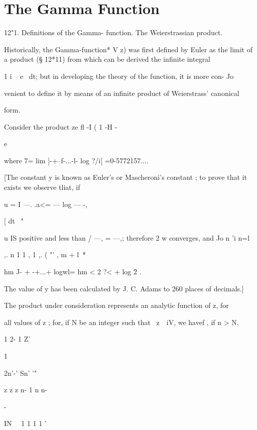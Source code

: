 \chapter{The Gamma Function} 

12"1. Definitions of the Gamma- function. The Weierstrassian product.

Historically, the Gamma-function* V z) was first defined by Euler as
the limit of a product (§ 12*11) from which can be derived the
infinite integral

1 i ~ e~ dt; but in developing the theory of the function, it is more
con- Jo

venient to define it by means of an infinite product of Weierstrass'
canonical

form.



Consider the product ze fl -I ( 1 -H -



e



where 7= lim ]-+--f-...-l- log ?/i[ =0-5772157....

[The constant y is known as Euler's or Mascheroni's constant ; to
prove that it exists we observe tliat, if

u = I —. .a<= — log — -,

[ dt \ "

u IS positive and less than / —, = —,; therefore 2 w converges, and Jo
n 'i n=l

,. n 1 1 , 1 ,. ( "' , m + l\ *

hm J- + -+...+ logwl= hm < 2 ?< + log \= 2 .

The value of y has been calculated by J. C. Adams to 260 places of
decimals.]

The product under consideration represents an analytic function of z,
for

all values of z ; for, if N be an integer such that \ z\ \ iV, we
havef , if n > N,





1 2- 1 Z'


1




2n'-' Sn' '"


  


z z z n- 1 n n-


-



IN \ \ 1 1 1 1 '

